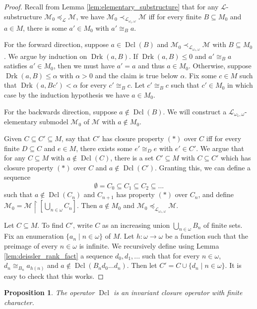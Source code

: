 \documentclass[12pt]{amsart}
\theoremstyle{plain}
\newtheorem{proposition}[theorem]{Proposition}
\theoremstyle{definition}
\newcommand{\countlogic}{\mathcal{L}_{\omega_1, \omega}}
\newcommand{\isom}{\cong}
\newcommand{\mcL}{\mathcal{L}}
\newcommand{\mcM}{\mathcal{M}}
\DeclareMathOperator{\Drk}{Drk}
\DeclareMathOperator{\Dcl}{Dcl}
\begin{document}
\begin{proof}
Recall from Lemma \ref{lem:elementary_substructure} that for any $\mcL$-substructure $\mcM_0 \preceq_{\mcL} \mcM$, we have $\mcM_0 \prec_{\countlogic} \mcM$ iff for every finite $B \subseteq M_0$ and $a \in M$, there is some $a' \in M_0$ with $a' \isom_B a$.

For the forward direction, suppose $a \in \Dcl(B)$ and $\mcM_0 \prec_{\countlogic} \mcM$ with $B \subseteq M_0$.
We argue by induction on $\Drk(a, B)$.
If $\Drk(a, B) \le 0$ and $a' \isom_B a$ satisfies $a' \in M_0$, then we must have $a' = a$ and thus $a \in M_0$.
Otherwise, suppose $\Drk(a, B) \le \alpha$ with $\alpha > 0$ and the claim is true below $\alpha$.
Fix some $c \in M$ such that $\Drk(a, Bc') < \alpha$ for every $c' \isom_B c$.
Let $c' \isom_B c$ such that $c' \in M_0$ in which case by the induction hypothesis we have $a \in M_0$.

For the backwards direction, suppose $a \not\in \Dcl(B)$.
We will construct a $\countlogic$-elementary submodel $\mcM_0$ of $\mcM$ with $a \not\in M_0$.

Given $C \subseteq C' \subseteq M$, say that $C'$ has closure property $(*)$ over $C$ iff for every finite $D \subseteq C$ and $e \in M$, there exists some $e' \isom_D e$ with $e' \in C'$.
We argue that for any $C \subseteq M$ with $a \not\in \Dcl(C)$, there is a set $C' \subseteq M$ with $C \subseteq C'$ which has closure property $(*)$ over $C$ and $a \not\in \Dcl(C')$.
Granting this, we can define a sequence 
\[\emptyset = C_0 \subseteq C_1 \subseteq C_2 \subseteq ...\]
such that $a \not\in \Dcl(C_n)$ and $C_{n+1}$ has property $(*)$ over $C_n$, and define $\mcM_0 = \mcM \upharpoonright [\bigcup_{n \in \omega} C_n]$.
Then $a \not\in M_0$ and $\mcM_0 \preceq_{\countlogic} \mcM$.

Let $C \subseteq M$.
To find $C'$, write $C$ as an increasing union $\bigcup_{n \in \omega} B_n$ of finite sets.
Fix an enumeration $\{a_n \mid n \in \omega\}$ of $M$.
Let $h : \omega \rightarrow \omega$ be a function such that the preimage of every $n \in \omega$ is infinite.
We recursively define using Lemma \ref{lem:deissler_rank_fact} a sequence $d_0, d_1, ...$ such that for every $n \in \omega$, $d_n \isom_{B_n} a_{h(n)}$ and $a \not\in \Dcl(B_nd_0...d_{n})$.
Then let $C' = C \cup \{d_n \mid n \in \omega\}$.
It is easy to check that this works.
\end{proof}

\begin{proposition}\label{prop:Dcl_property}
The operator $\Dcl$ is an invariant closure operator with finite character.
\end{proposition}
\end{document}
